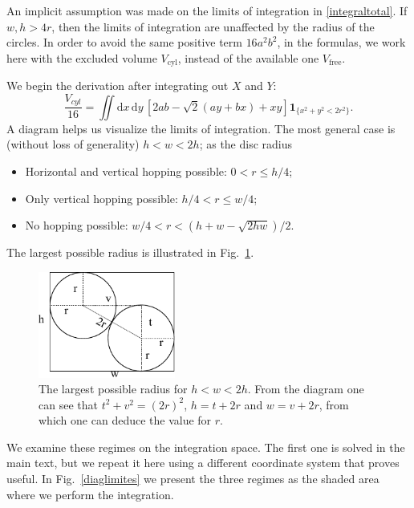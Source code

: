 \documentclass[superscriptaddress,pre,reprint,showpacs,twocolumn]{revtex4-1}
\newcommand{\rd}[1]{\mathrm{d}{#1} \,}
\newcommand{\indicatorsymbol}{\mathbf{1}}
\newcommand{\indicator}[1]{\indicatorsymbol_{ \{   #1 \} } }
\begin{document}
An implicit assumption was made on the limits of integration
in \eqref{integraltotal}. If $w, h > 4r$, then the limits of integration
are unaffected by the radius of the circles.
In order to avoid the same positive term $16a^2b^2$, 
in the formulas, we work here with
the excluded volume $V_\text{cyl}$, instead of the available one $V_\text{free}$. 


We begin the derivation after integrating out $X$ and $Y$:
\begin{equation}\label{VolumenGeneral}
\frac{V_{cyl}}{16}  =\iint \rd x \rd y \left[ 2ab-\sqrt{2}(ay+bx)+x y \right]
\indicator{x^2+y^2 < 2r^2 }.
\end{equation}
A diagram helps us visualize the limits of integration. The most general
case is (without loss of generality) $h < w < 2h$; as the disc radius 
\begin{itemize}
\item Horizontal and vertical hopping possible: $0 <r \leq h/4$;
\item Only vertical hopping possible: $h/4 < r \leq w/4$;
\item No hopping possible: $w/4 < r < (h+w - \sqrt{2hw}) / 2$.
\end{itemize}
The largest possible radius is illustrated in Fig.~\ref{radiomaximo}.

\begin{figure}[h]
  \centering
  \includegraphics[width=0.4\textwidth]{figures/DiagramaRadioMaximo.pdf}
  \caption{The largest possible radius for $h<w<2h$. From the diagram
    one can see that $t^2+v^2=(2r)^2$, $h=t+2r$ and $w=v+2r$, from which
    one can deduce the value for $r$.}
  \label{radiomaximo}
\end{figure}

We examine these regimes on the integration space. The first one is solved
in the main text, but we repeat it here using a different coordinate system
that proves useful. In Fig.~\ref{diaglimites} we present the three regimes as
the shaded area where we perform the integration. 
  
\end{document}

